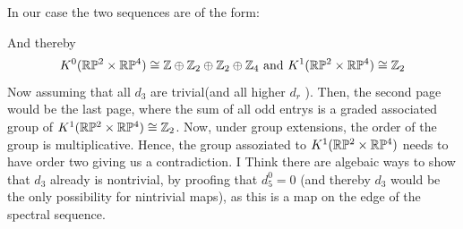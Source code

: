 \begin{example}[$\R\PP^2\times \R\PP^4$]
\begin{center}
	\end{center}In our case the two sequences are of the form:\begin{center}
	\end{center}
\end{example}

And thereby \begin{equation*}
		K^0(\mathbb{R}\mathbb{P}^2\times \mathbb{R}\mathbb{P}^4)\cong \mathbb{Z}\oplus \mathbb{Z}_2\oplus \mathbb{Z}_2\oplus \mathbb{Z}_4\text{ and }	K^1(\mathbb{R}\mathbb{P}^2\times \mathbb{R}\mathbb{P}^4)\cong \mathbb{Z}_2
\end{equation*}
Now assuming that all $d_3$ are trivial(and all higher $d_r$ ). Then, the second page would be the last page, where the sum of all odd entrys is a graded associated group of $K^1(\mathbb{R}\mathbb{P}^2\times \mathbb{R}\mathbb{P}^4)\cong \mathbb{Z}_2$. Now, under group extensions, the order of the group is multiplicative. Hence, the group assoziated to $K^1(\mathbb{R}\mathbb{P}^2\times \mathbb{R}\mathbb{P}^4)$ needs to have order two giving us a contradiction. I Think there are algebaic ways to show that $d_3$ already is nontrivial, by proofing that $d_5^0=0$ (and thereby $d_3$ would be the only possibility for nintrivial maps), as this is a map on the edge of the spectral sequence.

